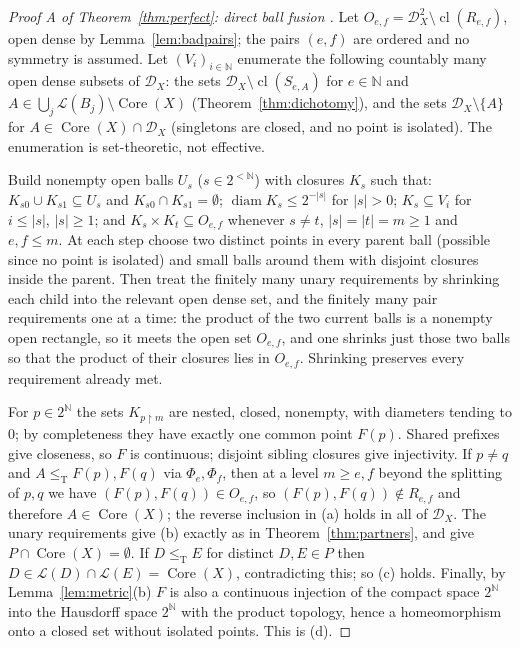 \documentclass[11pt,letterpaper]{article}
\theoremstyle{definition}
\numberwithin{equation}{section}
\newcommand{\N}{\mathbb N}
\newcommand{\Cantor}{2^{\N}}
\newcommand{\strings}{2^{<\N}}
\newcommand{\leT}{\le_{\mathrm T}}
\newcommand{\DX}[1]{\mathcal D_{#1}}
\newcommand{\Low}{\mathcal L}
\newcommand{\Core}{\operatorname{Core}}
\newcommand{\rest}{\mathbin{\upharpoonright}}
\newcommand{\cl}{\operatorname{cl}}
\newcommand{\diam}{\operatorname{diam}}
\newcommand{\src}[1]{\leavevmode{\sffamily\footnotesize\color{Steel}[#1]}}
\newenvironment{proofA}[1]{\begin{proof}[#1]}{\end{proof}}
\begin{document}
\begin{proofA}{Proof A of Theorem~\ref{thm:perfect}: direct ball fusion \src{R9}}
Let $O_{e,f}=\DX X^2\setminus\cl(R_{e,f})$, open dense by Lemma~\ref{lem:badpairs}; the pairs $(e,f)$ are ordered and no symmetry is assumed. Let $(V_i)_{i\in\N}$ enumerate the following countably many open dense subsets of $\DX X$: the sets $\DX X\setminus\cl(S_{e,A})$ for $e\in\N$ and $A\in\bigcup_j\Low(B_j)\setminus\Core(X)$ (Theorem~\ref{thm:dichotomy}), and the sets $\DX X\setminus\{A\}$ for $A\in\Core(X)\cap\DX X$ (singletons are closed, and no point is isolated). The enumeration is set-theoretic, not effective.

Build nonempty open balls $U_s$ ($s\in\strings$) with closures $K_s$ such that: $K_{s0}\cup K_{s1}\subseteq U_s$ and $K_{s0}\cap K_{s1}=\emptyset$; $\diam K_s\le2^{-|s|}$ for $|s|>0$; $K_s\subseteq V_i$ for $i\le|s|$, $|s|\ge1$; and $K_s\times K_t\subseteq O_{e,f}$ whenever $s\ne t$, $|s|=|t|=m\ge1$ and $e,f\le m$. At each step choose two distinct points in every parent ball (possible since no point is isolated) and small balls around them with disjoint closures inside the parent. Then treat the finitely many unary requirements by shrinking each child into the relevant open dense set, and the finitely many pair requirements one at a time: the product of the two current balls is a nonempty open rectangle, so it meets the open set $O_{e,f}$, and one shrinks just those two balls so that the product of their closures lies in $O_{e,f}$. Shrinking preserves every requirement already met.

For $p\in\Cantor$ the sets $K_{p\rest m}$ are nested, closed, nonempty, with diameters tending to $0$; by completeness they have exactly one common point $F(p)$. Shared prefixes give closeness, so $F$ is continuous; disjoint sibling closures give injectivity. If $p\ne q$ and $A\leT F(p),F(q)$ via $\Phi_e,\Phi_f$, then at a level $m\ge e,f$ beyond the splitting of $p,q$ we have $(F(p),F(q))\in O_{e,f}$, so $(F(p),F(q))\notin R_{e,f}$ and therefore $A\in\Core(X)$; the reverse inclusion in (a) holds in all of $\DX X$. The unary requirements give (b) exactly as in Theorem~\ref{thm:partners}, and give $P\cap\Core(X)=\emptyset$. If $D\leT E$ for distinct $D,E\in P$ then $D\in\Low(D)\cap\Low(E)=\Core(X)$, contradicting this; so (c) holds. Finally, by Lemma~\ref{lem:metric}(b) $F$ is also a continuous injection of the compact space $\Cantor$ into the Hausdorff space $\Cantor$ with the product topology, hence a homeomorphism onto a closed set without isolated points. This is (d).
\end{proofA}
\end{document}
